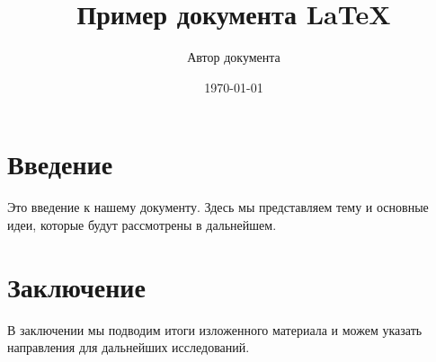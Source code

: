 \documentclass{article}
\title{Пример документа LaTeX}
\author{Автор документа}
\date{\today}
\begin{document}
\maketitle

\section{Введение}
Это введение к нашему документу. Здесь мы представляем тему и основные идеи, которые будут рассмотрены в дальнейшем.

\section{Заключение}
В заключении мы подводим итоги изложенного материала и можем указать направления для дальнейших исследований.
\end{document}
